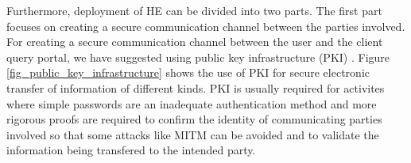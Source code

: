 Furthermore, deployment of HE can be divided into two parts. The first part focuses on creating a secure communication channel between the parties involved. For creating a secure communication channel between the user and the client query portal, we have suggested using public key infrastructure (PKI) \cite{PKI}. Figure \ref{fig_public_key_infrastructure} shows the use of PKI for secure electronic transfer of information of different kinds. PKI is usually required for activites where simple passwords are an inadequate authentication method and more rigorous proofs are required to confirm the identity of communicating parties involved so that some attacks like MITM can be avoided and to validate the information being transfered to the intended party.



